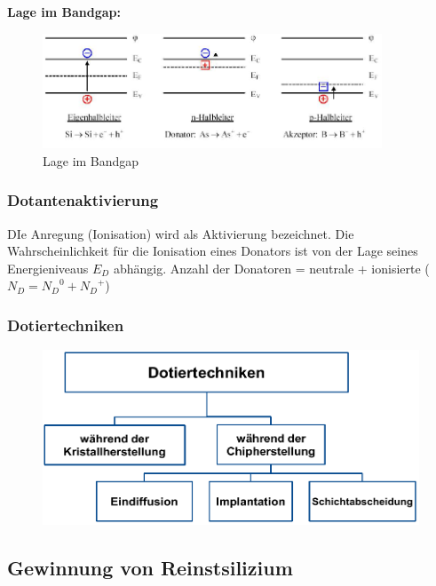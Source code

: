 		\textbf{Lage im Bandgap:}
		\begin{figure}[h!]
			\centering
			\includegraphics[width=0.9\textwidth]{Kapitel/Kap02/bandgapLage.PNG}
			\caption{Lage im Bandgap}
			\label{02_bandgap}
		\end{figure}
		
	\subsubsection{Dotantenaktivierung}
	DIe Anregung (Ionisation) wird als Aktivierung bezeichnet. Die Wahrscheinlichkeit für die Ionisation eines Donators ist von der Lage seines Energieniveaus $E_D$ abhängig. 
	Anzahl der Donatoren = neutrale + ionisierte ($N_D = {N_D}^0 + {N_D}^+$)
	
	\subsubsection{Dotiertechniken}
		\begin{figure}[h!]
			\centering
			\includegraphics[width=\textwidth]{Kapitel/Kap02/dotiertechniken.PNG}
			\label{02_dotiertechniken}
		\end{figure}
		
\subsection{Gewinnung von Reinstsilizium}

